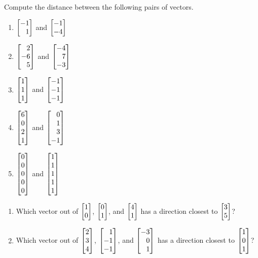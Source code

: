 \begin{exercises}
\begin{problist}
		\prob Compute the distance between the following pairs of vectors.
		\begin{enumerate}
			\item $\mat{-1\\1}$ and $\mat{-1\\-4}$
			\item $\mat{2\\-6\\5}$ and $\mat{-4\\7\\-3}$
			\item $\mat{1\\1\\1}$ and $\mat{-1\\-1\\-1}$
			\item $\mat{6\\0\\2\\1}$ and $\mat{0\\1\\3\\-1}$
			\item $\mat{0\\0\\0\\0\\0}$ and $\mat{1\\1\\1\\1\\1}$
		\end{enumerate}

		\prob
		\begin{enumerate}
			\item Which vector out of $\mat{1\\0}$, $\mat{0\\1}$, and $\mat{4\\1}$
			has a direction closest to $\mat{3\\5}$?
			\item Which vector out of $\mat{2\\3\\4}$, $\mat{1\\-1\\-1}$, and $\mat{-3\\0\\1}$
			has a direction closest to $\mat{1\\0\\1}$?
		\end{enumerate}


\end{problist}
\end{exercises}
